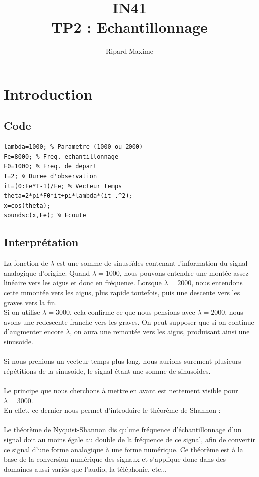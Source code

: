 \documentclass[a4paper, oneside]{report}
\title{IN41 \\ TP2 :  Echantillonnage}
\author{Ripard Maxime}
\begin{document}
  \maketitle
  \newpage{}
  \tableofcontents
  \newpage{}


  \chapter{Introduction}
    \section{Code}
    
  \begin{lstlisting}
lambda=1000; % Parametre (1000 ou 2000)
Fe=8000; % Freq. echantillonnage
F0=1000; % Freq. de depart
T=2; % Duree d'observation
it=(0:Fe*T-1)/Fe; % Vecteur temps
theta=2*pi*F0*it+pi*lambda*(it .^2);
x=cos(theta);
soundsc(x,Fe); % Ecoute
\end{lstlisting}
  
  \section{Interpr\'etation}
  
La fonction de $\lambda$ est une somme de sinuso\"ides contenant l'information du signal analogique d'origine.
Quand $\lambda=1000$, nous pouvons entendre une mont\'ee assez lin\'eaire vers les aigus et donc en fr\'equence. 
Lorsque $\lambda=2000$, nous entendons cette m mont\'ee vers les aigus, plus rapide toutefois, puis une descente vers les graves vers la fin.
\\
Si on utilise $\lambda=3000$, cela confirme ce que nous pensions avec $\lambda=2000$, nous avons une redescente franche vers les graves. On peut supposer que si on continue d'augmenter encore $\lambda$, on aura une remont\'ee vers les aigus, produisant ainsi une sinuso\¨ide.
\\
\\
Si nous prenions un vecteur temps plus long, nous aurions surement plusieurs répétitions de la sinuso\¨ide, le signal \'etant une somme de sinuso\¨ides.
\\
\\
Le principe que nous cherchons \`a mettre en avant est nettement visible pour $\lambda=3000$.\\
En effet, ce dernier nous permet d'introduire le th\'eor\`eme de Shannon :
\\
\\
Le th\'eor\`eme de Nyquist-Shannon dis qu'une fr\'equence d'\'echantillonnage d'un signal doit  au moins \'egale au double de la fr\'equence de ce signal, afin de convertir ce signal d'une forme analogique \`a une forme num\'erique. Ce th\'eor\`eme est \`a la base de la conversion num\'erique des signaux et s'applique donc dans des domaines aussi vari\'es que l'audio, la t\'el\'ephonie, etc...
\end{document}
